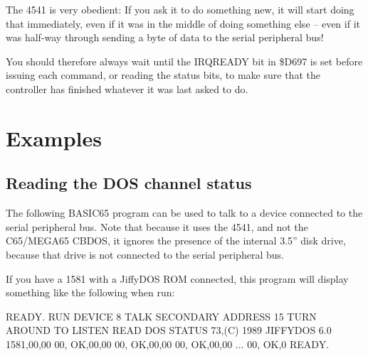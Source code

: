 The 4541 is very obedient: If you ask it to do something new, it
will start doing that immediately, even if it was in the middle of
doing something else -- even if it was half-way through sending a byte
of data to the serial peripheral bus!  

You should therefore always wait until the IRQREADY bit in \$D697 is
set before issuing each command, or reading the status bits, to make
sure that the controller has finished whatever it was last asked to
do.

\section{Examples}

\subsection{Reading the DOS channel status}

The following BASIC65 program can be used to talk to a device
connected to the serial peripheral bus. Note that because it uses the
4541, and not the C65/MEGA65 CBDOS, it ignores the presence of the
internal 3.5'' disk drive, because that drive is not connected to the
serial peripheral bus.


If you have a 1581 with a JiffyDOS{\texttrademark} ROM connected, this
program will display something like the following when run:

\begin{screencode}
READY.
RUN
DEVICE 8 TALK
SECONDARY ADDRESS 15
TURN AROUND TO LISTEN
READ DOS STATUS
73,(C) 1989 JIFFYDOS 6.0 1581,00,00
00, OK,00,00
00, OK,00,00
00, OK,00,00
...
00, OK,0
READY.
\end{screencode}

